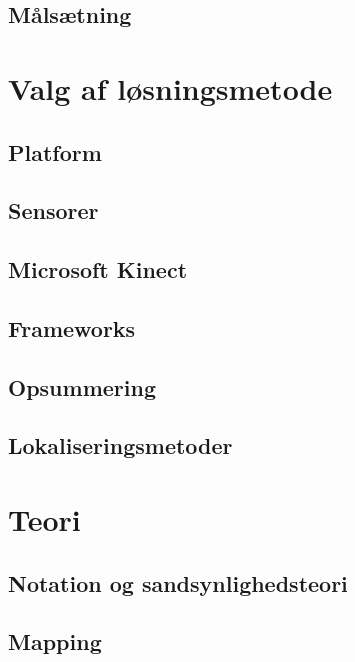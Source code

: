 \chapter*{Målsætning}

\clearpage

\part{Valg af løsningsmetode}


\chapter{Platform}

\chapter{Sensorer}

\chapter{Microsoft Kinect}

\chapter{Frameworks}



\chapter{Opsummering}

\chapter{Lokaliseringsmetoder}


\part{Teori}
\chapter{Notation og sandsynlighedsteori}

\chapter{Mapping}



